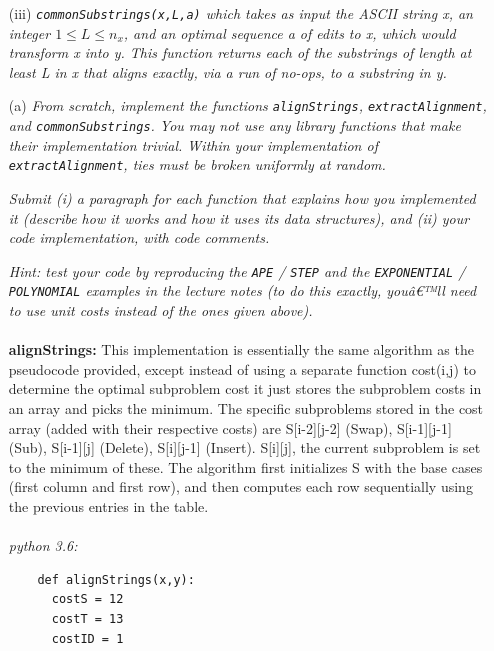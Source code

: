\documentclass[11pt]{article} \setlength{\oddsidemargin}{0in}
\begin{document}
{\begin{enumerate}
\begin{verbatim}
extractAlignment(S,x,y) : // S is an optimal cost matrix from alignStrings
  initialize a            // empty vector of edit operations
  [i,j] = [nx,ny]         // initialize the search for a path to S[0,0]
  while i > 0 or j > 0
    a[i] = determineOptimalOp(S,i,j,x,y) // what was an optimal choice?
    [i,j] = updateIndices(S,i,j,a) // move to next position
  }
  return a
\end{verbatim}

    \textit{When storing the sequence of edit operations in
      \texttt{a}, use a special symbol to denote no-ops.}

  \item[(iii)] \textit{\texttt{commonSubstrings(x,L,a)} which takes as
      input the ASCII string x, an integer $1 \le L \le n_x$, and an
      optimal sequence a of edits to x, which would transform x into
      y. This function returns each of the substrings of length at
      least L in x that aligns exactly, via a run of no-ops, to a
      substring in y.}
  \end{enumerate}

  \begin{enumerate}
  \item[(a)] \textit{From scratch, implement the functions
      \texttt{alignStrings}, \texttt{extractAlignment}, and
      \texttt{commonSubstrings}. You may not use any library functions
      that make their implementation trivial. Within your
      implementation of \texttt{extractAlignment}, ties must be broken
      uniformly at random.}

    \textit{Submit (i) a paragraph for each function that explains how
      you implemented it (describe how it works and how it uses its
      data structures), and (ii) your code implementation, with code
      comments.}

    \textit{Hint: test your code by reproducing the \texttt{APE} /
      \texttt{STEP} and the \texttt{EXPONENTIAL} / \texttt{POLYNOMIAL}
      examples in the lecture notes (to do this exactly, youâ€™ll need
      to use unit costs instead of the ones given above).}
    \pagebreak
    \\\\
    \textbf{alignStrings:}
    This implementation is essentially the same algorithm as the pseudocode provided, except instead of using a separate function cost(i,j) to determine the optimal subproblem cost it just stores the subproblem costs in an array and picks the minimum. 
    The specific subproblems stored in the cost array (added with their respective costs) are S[i-2][j-2] (Swap), S[i-1][j-1] (Sub), S[i-1][j] (Delete), S[i][j-1] (Insert). S[i][j], the current subproblem is set to the minimum of these. 
    The algorithm first initializes S with the base cases (first column and first row), and then computes each row sequentially using the previous entries in the table. \\\\
    \textit{python 3.6:}
    \begin{verbatim}
    def alignStrings(x,y):
      costS = 12
      costT = 13
      costID = 1


\end{verbatim}
\end{enumerate}}
\end{document}

